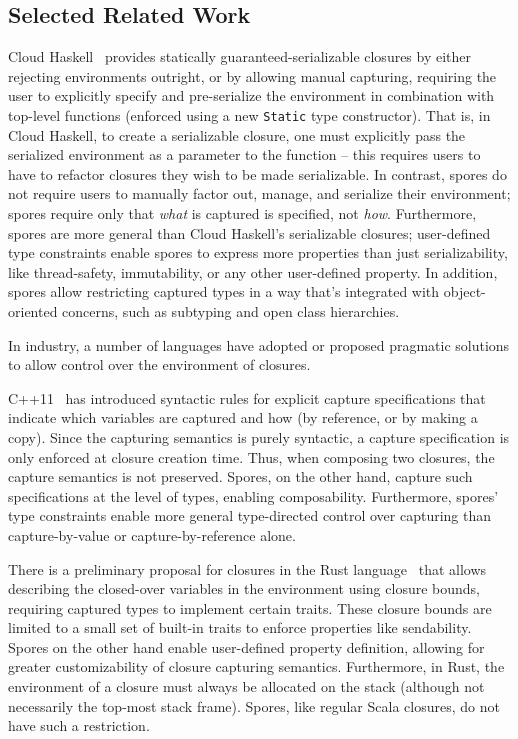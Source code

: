 \documentclass{llncs}
\begin{document}
\subsection{Selected Related Work}

Cloud Haskell~\cite{CloudHaskell} provides statically guaranteed-serializable
closures by either rejecting environments outright, or by allowing manual
capturing, requiring the user to explicitly specify and pre-serialize the
environment in combination with top-level functions (enforced using a new
\verb|Static| type constructor). That is, in Cloud Haskell, to create a
serializable closure, one must explicitly pass the serialized environment as a
parameter to the function -- this requires users to have to refactor closures
they wish to be made serializable. In contrast, spores
do not require users to manually factor out, manage, and serialize their
environment; spores require only that {\em what} is captured is specified, not
{\em how}. Furthermore, spores are more general than Cloud Haskell's
serializable closures; user-defined type constraints enable spores to
express more properties than just serializability, like thread-safety,
immutability, or any other user-defined property. In addition, spores allow
restricting captured types in a way that's integrated with object-oriented
concerns, such as subtyping and open class hierarchies.

In industry, a number of languages have adopted or proposed pragmatic
solutions to allow control over the environment of closures.

C++11~\cite{CplusplusLambas} has introduced syntactic rules for explicit
capture specifications that indicate which variables are captured and how (by
reference, or by making a copy). Since the capturing semantics is purely
syntactic, a capture specification is only enforced at closure creation time.
Thus, when composing two closures, the capture semantics is not preserved.
Spores, on the other hand, capture such specifications at the level of types,
enabling composability. Furthermore, spores' type constraints enable more
general type-directed control over capturing than capture-by-value or
capture-by-reference alone.

There is a preliminary proposal for closures in the Rust
language~\cite{RustFunctions} that allows describing the closed-over variables
in the environment using closure bounds, requiring captured types to implement
certain traits. These closure bounds are limited to a small set of built-in
traits to enforce properties like sendability. Spores on the other hand enable
user-defined property definition, allowing for greater customizability of
closure capturing semantics. Furthermore, in Rust, the environment of a
closure must always be allocated on the stack (although not necessarily the
top-most stack frame). Spores, like regular Scala closures, do not have such a
restriction.
\end{document}
